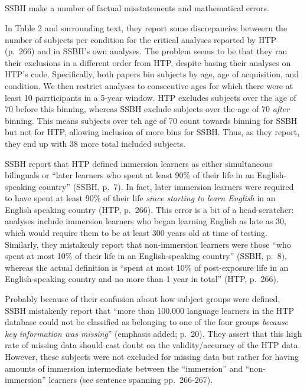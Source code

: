 \clearpage



\begin{appendix}
\section{}
SSBH make a number of factual misstatements and mathematical errors.

In Table 2 and surrounding text, they report some discrepancies betweern
the number of subjects per condition for the critical analyses reported
by HTP (p.~266) and in SSBH's own analyses. The problem seems to be that
they ran their exclusions in a different order from HTP, despite basing
their analyses on HTP's code. Specifically, both papers bin subjects by
age, age of acquisition, and condition. We then restrict analyses to
consecutive ages for which there were at least 10 parrticipants in a
5-year window. HTP excludes subjects over the age of 70 before this
binning, whereas SSBH exclude subjects over the age of 70 \emph{after}
binning. This means subjects over teh age of 70 count towards binning
for SSBH but not for HTP, allowing inclusion of more bins for SSBH.
Thus, as they report, they end up with 38 more total included subjects.

SSBH report that HTP defined immersion learners as either simultaneous
bilinguals or ``later learners who spent at least 90\% of their life in
an English-speaking country'' (SSBH, p.~7). In fact, later immersion
learners were required to have spent at least 90\% of their life
\emph{since starting to learn English} in an English speaking country
(HTP, p.~266). This error is a bit of a head-scratcher: analyses include
immersion learners who began learning English as late as 30, which would
require them to be at least 300 years old at time of testing. Similarly,
they mistakenly report that non-immersion learners were those ``who
spent at most 10\% of their life in an English-speaking country'' (SSBH,
p.~8), whereas the actual definition is ``spent at most 10\% of
post-exposure life in an English-speaking country and no more than 1
year in total'' (HTP, p.~266).

Probably because of their confusion about how subject groups were
defined, SSBH mistakenly report that ``more than 100,000 language
learners in the HTP database could not be classified as belonging to one
of the four groups \emph{because key information was missing}''
(emphasis added; p.~20). They assert that this high rate of missing data
should cast doubt on the validity/accuracy of the HTP data. However,
these subjects were not excluded for missing data but rather for having
amounts of immersion intermediate between the ``immersion'' and
``non-immersion'' learners (see sentence spanning pp.~266-267).


\end{appendix}
